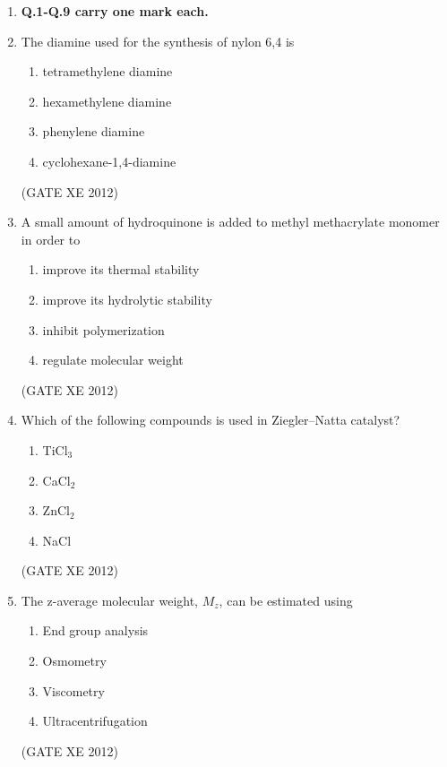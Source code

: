 \documentclass[12pt]{article}
\begin{document}
\begin{enumerate}

\item[] \textbf{Q.1-Q.9 carry one mark each.}

\item The diamine used for the synthesis of nylon 6,4 is
\begin{multicols}{2}
\begin{enumerate}
\item tetramethylene diamine
\item hexamethylene diamine
\item phenylene diamine
\item cyclohexane-1,4-diamine
\end{enumerate}
\end{multicols}
(GATE XE 2012)

\item A small amount of hydroquinone is added to methyl methacrylate monomer in order to
\begin{enumerate}
\item improve its thermal stability
\item improve its hydrolytic stability
\item inhibit polymerization
\item regulate molecular weight
\end{enumerate}
(GATE XE 2012)

\item Which of the following compounds is used in Ziegler–Natta catalyst?
\begin{multicols}{2}
\begin{enumerate}
\item TiCl$_3$
\item CaCl$_2$
\item ZnCl$_2$
\item NaCl
\end{enumerate}
\end{multicols}
(GATE XE 2012)

\item The z-average molecular weight, $M_z$, can be estimated using
\begin{multicols}{2}
\begin{enumerate}
\item End group analysis
\item Osmometry
\item Viscometry
\item Ultracentrifugation
\end{enumerate}
\end{multicols}
(GATE XE 2012)


\end{enumerate}
\end{document}

